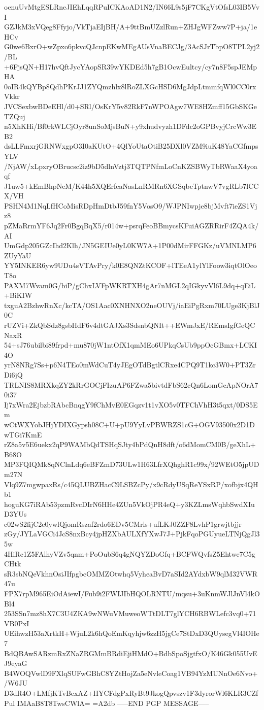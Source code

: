 oenuUvMtgESLRneJIEhLqqRPuICKAoAD1N2/IN66L9s5jF7CKgVtOfsL03IB5VvI
GZJkM3xVQeg8Ffyjo/VkTjaEIjBH/A+9ttBmUZzlRun+ZHJgWFZww7P+ja/1eHCv
G0we6BxrO+wZpxo6pkvcQJcnpEKwMEgAUsVnaBECJg/3AcSJrTbpO8TPL2yj2/BL
+6FjsQN+H17hvQftJycYAopSR39wYKDEd5h7gB1OcwEultcy/cy7n8F5spJEMpHA
0oIR4kQYBp8QdhPKrJJ1ZYQmzhlx8lRoZLXGcHSD6MgJdpLtmmfqWl0CC0rxVkkr
JVCSexbwBDeEHl/d0+SRl/OsKrY5v82RkF7nWPOAgw7WE8HZmff15GbSKGeTZQuj
n5XhKHi/Bf0rkWLCjOyr8unSoMjsBuN+y9xhudvyzh1DFdc2oGPBvyjCrcWw3EB2
dsLLFmxrjGRNWxgpO3I0aKUtO+4QlYoUtaOtiB25DXl0VZM9iuK48YaCGfmpsYLV
/NjAW/xLpxryOBrucsc2iz9bD5dlnVztj3TQTPNfmLoCnKZSBWyTbRWaaX4yoaqf
J1uw5+kEmBhpNeM/K44h5XQErfeaNasLnRMRn6XGSqbcTptnwV7vgRLb7lCCX/VH
PSHN4M1NqLfHCoMisRDpHmDtbJ59fnY5VosO9/WJPNIwpje8bjMvft7ieZS1Vjz8
pZMaRrmYF6Jq2Fr0BgqBqX5/r014w+psrqFeoBBmycsKFuiAGZRRirF4ZQA4k/AI
UmGdp205GZcIhd2Klh/JN5GEIUe0yL0KW7A+1P00dMirFFGKz/uVMNLMP6ZUyYaU
YY5INKER6yw9UDu4sVTAvPry/k0E8QNZtKCOF+lTEeA1ylYlFoow3iqtOlOeoT8o
PAXM7Wvam0G/biP/gChxLVFpWKRTXH4gAr7nMGL2qIGkyvVl6L9dq+qEiL+BiKIW
txguA2BzhwRnXc/kcTA/OS1Aac0XNHNXO2neOUVj/iaEiPgRxm70LUge3KjBlJ0C
rUZVi+ZkQbSdz8gsbHdF6v4dtGAJXs3SdsnbQNIt++EWmJxE/REmsIgfGeQCNaxR
54+sJ76ubilbi89frpd+mu870jW1ntOfX1qmMEo6UPkqCsUb9ppOcGBmx+LCKI4O
yrN8NRg7Ss+p6N4TEo0mWdCuT4yJEgOTdBgtlCRxe4CPQ9T1kc3W0+PT3ZrDi6jQ
TRLNIS8MRXkqZY2kRrGOCjFIzuAP6FZwa5bivtdFbS62cQn6LomGcApNOrA70i37
Ij7xWra2EjbzbRAbcBnqgY9fChMvE0EGqzv1t1vXO5v0TFChVhH3t5qxt/0DS5Em
wCtWXYobJHjYDIXGypsh08C+U+pU9YyLvPBWRZS1cG+OGV93500x2D1DwTGi7KmE
rZ8a5v5E6uekx2qP9WAMbQdTSHqSJty4bPdQnH8dft/o6dMomCM0B/geXhL+B68O
MP3FQIQMk8qNClnLdq6eBFZmD73ULw1H63LfrXQhghR1c99x/92WEtO5jpUDm27N
Vlq9Z7mgwpaxRs/c45QLUBZHacC9LSBZcPy/x9cRdyUSqReYSxRP/xofbjx4QHb1
hoguKG7iRAb53pzmRvcDIrN6HHe4ZUn5VkOjPR4eQ+y3KZLmsWqhbSwdXIuD3YUs
c02wS2fijC2e0ywlQjomRszaf2rdo6EDv5CMrls+ufLKJ0ZZF8LvhP1grwjtbjjr
zGy/JYLaVGCi4JcS8nxBcy4jpHZXbAULXfYXwJ7J+PjkFqoPGUyueLTNjQgJl35w
4HiRc1Z5FAlhyVZv5qnm+PoOubS6q4gNQYZDoGfq+BCFWQvfsZ5Ehtwe7C5gCHtk
sR3sbNQeVkhnOsiJIfpgbcOMMZOtwhq5VyheaBvD7aSId2AYdxbW9qlM32VWR47u
FPX7rpM965EiOdAiewI/Fub9i2FWIJIbHQOLRNTU/mqsu+3uKnmWJlJnVl4kOBl4
253SSn7mz8hX7C3U4ZKA9wNWuVMuweoWTtDLT7glYCH6RBWLefc3vq0+71VB0PxI
UEihwzH53aXrtkH+WjuL2k6hQoEmKqyhjw6zzH5jgCe7StDxD3QUysegVl4IOHe7
BdQBAwSARzmRxZNaZRGMmBRdiEjiHMdO+BdbSpoSjgtfxO/K46Gk055UvEJ9eyaG
B4WOQVwlD9FXlqSUFwGBhC8YZtHojZa5eNvleCoag1VB94YzMUNnOe6Nvo+/W6JU
D3dR4O+LMfjKTvBexAZ+HYCFdgPxRyBt9JkogQpvszv1F3dyrorWl6KLR3CZfPul
IMAaB8T8TwsCWlA=
=A2db
-----END PGP MESSAGE-----
